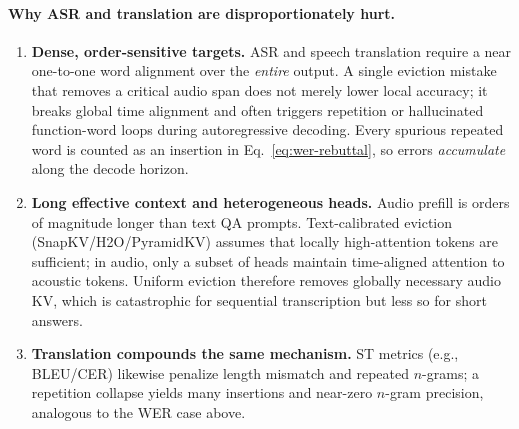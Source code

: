 \begin{answer}
\paragraph{Why ASR and translation are disproportionately hurt.}
\begin{enumerate}
    \item \textbf{Dense, order-sensitive targets.}
    ASR and speech translation require a near one-to-one word alignment over the \emph{entire} output.
    A single eviction mistake that removes a critical audio span does not merely lower local accuracy; it breaks global time alignment and often triggers repetition or hallucinated function-word loops during autoregressive decoding.
    Every spurious repeated word is counted as an insertion in Eq.~\eqref{eq:wer-rebuttal}, so errors \emph{accumulate} along the decode horizon.

    \item \textbf{Long effective context and heterogeneous heads.}
    Audio prefill is orders of magnitude longer than text QA prompts.
    Text-calibrated eviction (SnapKV/H2O/PyramidKV) assumes that locally high-attention tokens are sufficient; in audio, only a subset of heads maintain time-aligned attention to acoustic tokens.
    Uniform eviction therefore removes globally necessary audio KV, which is catastrophic for sequential transcription but less so for short answers.

    \item \textbf{Translation compounds the same mechanism.}
    ST metrics (e.g., BLEU/CER) likewise penalize length mismatch and repeated $n$-grams; a repetition collapse yields many insertions and near-zero $n$-gram precision, analogous to the WER case above.
\end{enumerate}


\end{answer}
